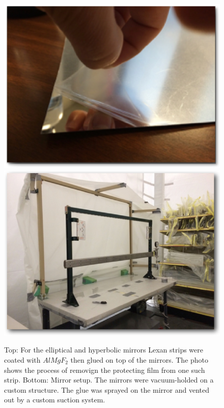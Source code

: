 \begin{figure}[t]
\centering
	\includegraphics[width=0.98\columnwidth,keepaspectratio]{img/filmOnStrip.png}
	\includegraphics[width=0.98\columnwidth,keepaspectratio]{img/mirrorSetup.png}
	\caption{Top: For the elliptical and hyperbolic mirrors Lexan strips were coated with $AlMgF_2$
             then glued on top of the mirrors. The photo shows the process of removign the
             protecting film from one such strip. Bottom: Mirror setup. The mirrors were
             vacuum-holded on a custom structure. The glue was sprayed on the mirror and
             vented out by a custom suction system.}
	\label{fig:filmOnStrip}
\end{figure}


